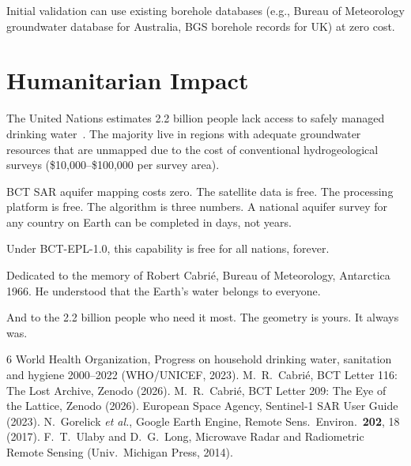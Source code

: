\documentclass[aps,prl,twocolumn,superscriptaddress]{revtex4-2}
\begin{document}
Initial validation can use existing borehole databases (e.g., Bureau of Meteorology groundwater database for Australia, BGS borehole records for UK) at zero cost.

\section{Humanitarian Impact}

The United Nations estimates 2.2 billion people lack access to safely managed drinking water~\cite{WHO2023}. The majority live in regions with adequate groundwater resources that are unmapped due to the cost of conventional hydrogeological surveys (\$10,000--\$100,000 per survey area).

BCT SAR aquifer mapping costs zero. The satellite data is free. The processing platform is free. The algorithm is three numbers. A national aquifer survey for any country on Earth can be completed in days, not years.

Under BCT-EPL-1.0, this capability is free for all nations, forever.

\begin{acknowledgments}
Dedicated to the memory of Robert Cabri\'e, Bureau of Meteorology, Antarctica 1966. He understood that the Earth's water belongs to everyone.

And to the 2.2 billion people who need it most. The geometry is yours. It always was.
\end{acknowledgments}

\begin{thebibliography}{6}
 World Health Organization, Progress on household drinking water, sanitation and hygiene 2000--2022 (WHO/UNICEF, 2023).
 M.~R.~Cabri\'e, BCT Letter 116: The Lost Archive, Zenodo (2026).
 M.~R.~Cabri\'e, BCT Letter 209: The Eye of the Lattice, Zenodo (2026).
 European Space Agency, Sentinel-1 SAR User Guide (2023).
 N.~Gorelick \emph{et al.}, Google Earth Engine, Remote Sens.\ Environ.\ \textbf{202}, 18 (2017).
 F.~T.~Ulaby and D.~G.~Long, Microwave Radar and Radiometric Remote Sensing (Univ.\ Michigan Press, 2014).
\end{thebibliography}
\end{document}
